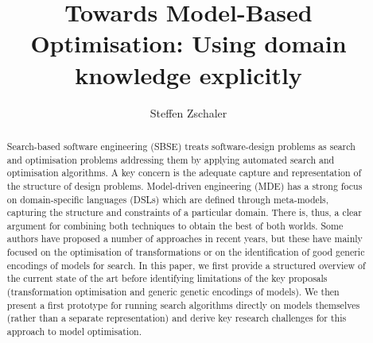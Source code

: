 \documentclass[draft]{llncs}
\title{Towards Model-Based Optimisation: Using domain knowledge explicitly}
\author{Steffen Zschaler\inst{1}}
\institute{
	Department of Informatics\\
	King's College London\\
	\email{szschaler@acm.org}
}
\begin{document}
	\maketitle
	
	\begin{abstract}
		Search-based software engineering (SBSE) treats soft\-ware-design problems as search and optimisation problems addressing them by applying automated
		search and optimisation algorithms. A key concern is the adequate capture and representation of the structure of design problems. Model-driven
		engineering (MDE) has a strong focus on domain-specific languages (DSLs) which are defined through meta-models, capturing the structure and constraints of a
		particular domain. There is, thus, a clear argument for combining both techniques to obtain the best of both worlds. Some authors have proposed a number of
		approaches in recent years, but these have mainly focused on the optimisation of transformations or on the identification of good generic encodings of models
		for search.
		In this paper, we first provide a structured overview of the current state of the art before identifying limitations of the key proposals (transformation
		optimisation and generic genetic encodings of models). We then present a first prototype for running search algorithms directly on models themselves (rather
		than a separate representation) and derive key research challenges for this approach to model optimisation.
		
		
	\end{abstract}
	
	
	
	

	
	
		
	
	
	
		
	
	
	
	
\end{document}
